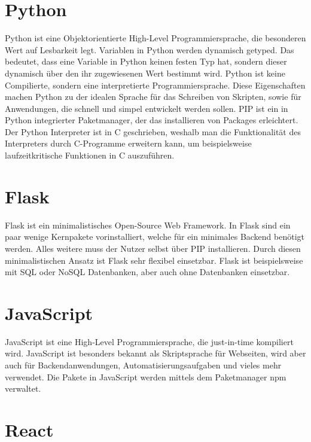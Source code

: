 \section{Python}
\label{sec:python}

Python ist eine Objektorientierte High-Level Programmiersprache, die besonderen Wert auf Lesbarkeit legt.
Variablen in Python werden dynamisch getyped.
Das bedeutet, dass eine Variable in Python keinen festen Typ hat, sondern dieser dynamisch über den ihr zugewiesenen Wert bestimmt wird.
Python ist keine Compilierte, sondern eine interpretierte Programmiersprache.
Diese Eigenschaften machen Python zu der idealen Sprache für das Schreiben von Skripten, sowie für Anwendungen, die schnell und simpel entwickelt werden sollen.
PIP ist ein in Python integrierter Paketmanager, der das installieren von Packages erleichtert.
Der Python Interpreter ist in C geschrieben, weshalb man die Funktionalität des Interpreters durch C-Programme erweitern kann, um beispielsweise laufzeitkritische Funktionen in C auszuführen.
~\autocite{van:python}

\section{Flask}
\label{sec:flask}

Flask ist ein minimalistisches Open-Source Web Framework.
In Flask sind ein paar wenige Kernpakete vorinstalliert, welche für ein minimales Backend benötigt werden.
Alles weitere muss der Nutzer selbst über PIP installieren.
Durch diesen minimalistischen Ansatz ist Flask sehr flexibel einsetzbar.
Flask ist beispielsweise mit SQL oder NoSQL Datenbanken, aber auch ohne Datenbanken einsetzbar.
~\autocite{grindberg:flask}


\section{JavaScript}
\label{sec:js}

JavaScript ist eine High-Level Programmiersprache, die just-in-time kompiliert wird.
JavaScript ist besonders bekannt als Skriptsprache für Webseiten, wird aber auch für Backendanwendungen, Automatisierungsaufgaben und vieles mehr verwendet.
Die Pakete in JavaScript werden mittels dem Paketmanager npm verwaltet.

\section{React}
\label{sec:react}

